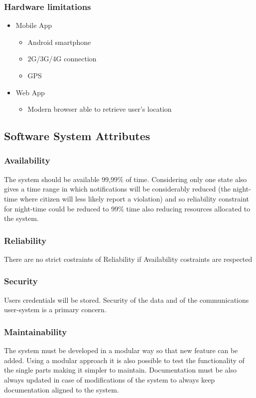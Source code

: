 \subsubsection{Hardware limitations}
\begin{itemize}
\item Mobile App
\begin{itemize}
\item Android smartphone
\item 2G/3G/4G connection
\item GPS
\end{itemize}
\item Web App
\begin{itemize}
\item Modern browser able to retrieve user's location
\end{itemize}
\end{itemize}
\subsection{Software System Attributes}
\subsubsection{Availability}
The system should be available 99,99\% of time. Considering only one state also gives a time range in which notifications will be considerably reduced (the night-time where citizen will less likely report a violation) and so reliability constraint for night-time could be reduced to 99\% time also reducing resources allocated to the system.
\subsubsection{Reliability}
There are no strict costraints of Reliability if Availability costraints are respected
\subsubsection{Security}

Users credentials will be stored. Security of the data and of the communications user-system is a primary concern.

\subsubsection {Maintainability}
The system must be developed in a modular way so that new feature can be added.
Using a modular approach it is also possible to test the functionality of the single parts making it simpler to maintain.
Documentation must be also always updated in case of modifications of the system to always keep documentation aligned to the system.
